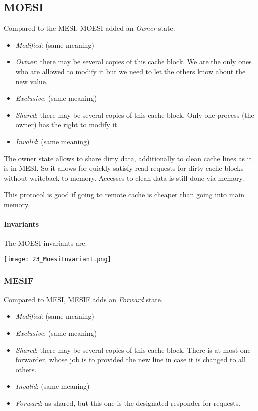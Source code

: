 

\subsection*{MOESI}
Compared to the MESI, MOESI added an \textit{Owner} state. 

\begin{itemize}
    \item \textit{Modified}: (same meaning)
    \item \textit{Owner}: there may be several copies of this cache block. We are the only ones who are allowed to modify it but we need to let the others know about the new value.
    \item \textit{Exclusive}: (same meaning)
    \item \textit{Shared}: there may be several copies of this cache block. Only one process (the owner) has the right to modify it.
    \item \textit{Invalid}: (same meaning)
\end{itemize}

The owner state allows to share dirty data, additionally to clean cache lines as it is in MESI. So it allows for quickly satisfy read requests for dirty cache blocks without writeback to memory. Accesses to clean data is still done via memory.

This protocol is good if going to remote cache is cheaper than going into main memory.

\paragraph{Invariants}
The MOESI invariants are:

\texttt{[image: 23\_MoesiInvariant.png]}

\subsubsection{MESIF}
Compared to MESI, MESIF adds an \textit{Forward} state.

\begin{itemize}
    \item \textit{Modified}: (same meaning)
    \item \textit{Exclusive}: (same meaning)
    \item \textit{Shared}: there may be several copies of this cache block. There is at most one forwarder, whose job is to provided the new line in case it is changed to all others.
    \item \textit{Invalid}: (same meaning)
    \item \textit{Forward}: as shared, but this one is the designated responder for requests.
\end{itemize}

